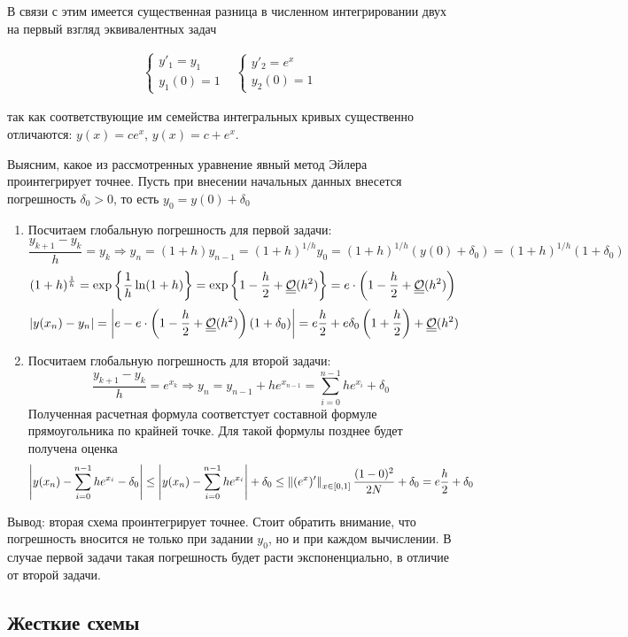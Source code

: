 В связи с этим имеется существенная разница в численном интегрировании
двух на первый взгляд эквивалентных задач

\[\begin{array}{cc} \begin{cases}y'_1=y_1 \\ y_1(0)=1\end{cases} & \begin{cases}y'_2=e^x \\ y_2(0)=1\end{cases} \end{array}\]

так как соответствующие им семейства интегральных кривых существенно
отличаются: $y(x) = ce^x$, $y(x) = c+e^x$.

Выясним, какое из рассмотренных уравнение явный метод
Эйлера проинтегрирует точнее. Пусть при внесении начальных
данных внесется погрешность $\delta_0>0$, то есть $y_0=y(0)+\delta_0$

\begin{enumerate}
  \item Посчитаем глобальную погрешность для первой задачи:
        \[\frac{y_{k+1}-y_k}{h}=y_k\Rightarrow y_{n}=(1+h)y_{n-1}=(1+h)^{1/h}y_0=(1+h)^{1/h}(y(0)+\delta_0)=(1+h)^{1/h}(1+\delta_0)\]
        \[(1+h)^{\frac{1}{h}}=\exp\left\{\frac{1}{h}\ln(1+h)\right\}=\exp\left\{1-\frac{h}{2}+\underline{\underline{\mathcal{O}}}(h^2)\right\}=e\cdot\left(1-\frac{h}{2}+\underline{\underline{\mathcal{O}}}(h^2)\right)\]
        \[\left\lvert y(x_n)-y_n\right\rvert=\left\lvert e-e\cdot\left(1-\frac{h}{2}+\underline{\underline{\mathcal{O}}}(h^2)\right)(1+\delta_0)\right\rvert= e\frac{h}{2}+e\delta_0\left(1+\frac{h}{2}\right)+\underline{\underline{\mathcal{O}}}(h^2)\]
  \item Посчитаем глобальную погрешность для второй задачи:
        \[\frac{y_{k+1}-y_k}{h}=e^{x_k}\Rightarrow y_{n}=y_{n-1}+he^{x_{n-1}}=\sum_{i=0}^{n-1}he^{x_i}+\delta_0\]
        Полученная расчетная формула соответстует составной формуле прямоугольника
        по крайней точке. Для такой формулы позднее будет получена
        оценка
        \[\left\lvert y(x_n)-\sum_{i=0}^{n-1}he^{x_i}-\delta_0\right\rvert\leq\left\lvert y(x_n)-\sum_{i=0}^{n-1}he^{x_i}\right\rvert+\delta_0\leq \left\lVert(e^x)'\right\rVert_{x\in[0,1]}\frac{(1-0)^2}{2N}+\delta_0=e\frac{h}{2}+\delta_0\]
\end{enumerate}

Вывод: вторая схема проинтегрирует точнее. Стоит обратить внимание,
что погрешность вносится не только при задании $y_0$, но
и при каждом вычислении. В случае первой задачи такая погрешность будет
расти экспоненциально, в отличие от второй задачи.

\subsection*{Жесткие схемы}

